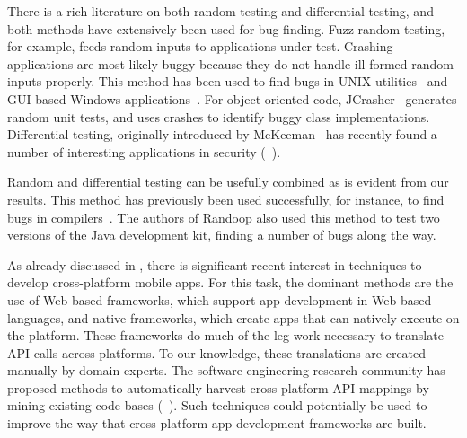 %
There is a rich literature on both random testing and differential testing, and
both methods have extensively been used for bug-finding. Fuzz-random testing,
for example, feeds random inputs to applications under test. Crashing
applications are most likely buggy because they do not handle ill-formed random
inputs properly. This method has been used to find bugs in UNIX
utilities~\cite{fuzz:unix} and GUI-based Windows applications~\cite{fuzz:nt}.
For object-oriented code, JCrasher~\cite{jcrasher} generates random unit tests,
and uses crashes to identify buggy class implementations. Differential testing,
originally introduced by McKeeman~\cite{mckeeman:difftest:1998}  has recently
found a number of interesting applications in security
(\eg~\cite{brumley:sec07,franken:oak14,oracle:pldi11}).

Random and differential testing can be usefully combined as is evident from our
results. This method has previously been used successfully, for instance, to
find bugs in compilers~\cite{csmith:pldi11}. The authors of Randoop also used
this method to test two versions of the Java development kit, finding a number
of bugs along the way.


%
As already discussed in , there is significant
recent interest in techniques to develop cross-platform mobile apps. For this
task, the dominant methods are the use of Web-based frameworks, which support
app development in Web-based languages, and native frameworks, which create
apps that can natively execute on the platform. These frameworks do much of the
leg-work necessary to translate API calls across platforms. To our knowledge,
these translations are created manually by domain experts. The software
engineering research community has proposed methods to automatically harvest
cross-platform API mappings by mining existing code bases
(\eg~\cite{mam:icse10,rosetta:icse13,robillard:tse}). Such techniques could
potentially be used to improve the way that cross-platform app development
frameworks are built.



